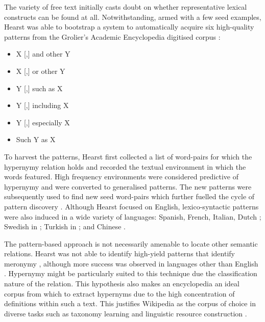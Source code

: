 The variety of free text initially casts doubt on whether representative lexical constructs can be found at all.  Notwithstanding, armed with a few seed examples, Hearst was able to bootstrap a system to automatically acquire six high-quality patterns \citep{hearst1992automatic} from the Grolier’s Academic Encyclopedia digitised corpus \citep{grolier1990academic}:

\begin{itemize}
    \item X [,] and other Y
    \item X [,] or other Y
    \item Y [,] such as X
    \item Y [,] including X
    \item Y [,] especially X
    \item Such Y as X
\end{itemize}

To harvest the patterns, Hearst first collected a list of word-pairs for which the hypernymy relation holds and recorded the textual environment in which the words featured.  High frequency environments were considered predictive of hypernymy and were converted to generalised patterns.  The new patterns were subsequently used to find new seed word-pairs which further fuelled the cycle of pattern discovery \citep{hearst1992automatic}.  Although Hearst focused on English, lexico-syntactic patterns were also induced in a wide variety of languages: Spanish, French, Italian, Dutch \citep{faralli2018misa}; Swedish \citep{rydin2002building} in \citep{sahin2017}; Turkish \citep{sahin2016extraction} in \citep{sahin2017}; and Chinese \citep{Fu2014}.

The pattern-based approach is not necessarily amenable to locate other semantic relations.  Hearst was not able to identify high-yield patterns that identify meronymy \citep{hearst1992automatic}, although more success was observed in languages other than English \citep{sahin2017}.  Hypernymy might be particularly suited to this technique due the classification nature of the relation.  This hypothesis also makes an encyclopedia an ideal corpus from which to extract hypernyms due to the high concentration of definitions within such a text.    This justifies Wikipedia as the corpus of choice in diverse tasks such as taxonomy learning \citep{bordea2016semeval} and linguistic resource construction \citep{Flati2016, Baroni2011}.  

